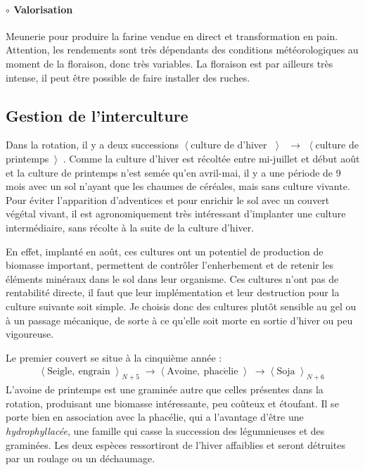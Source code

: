\documentclass{book}
\begin{document}
\paragraph{$\circ$ Valorisation} Meunerie pour produire la farine vendue en direct et transformation en pain. Attention, les rendements sont très dépendants des conditions météorologiques au moment de la floraison, donc très variables. La floraison est par ailleurs très intense, il peut être possible de faire installer des ruches.

\subsection{Gestion de l'interculture}

Dans la rotation, il y a deux successions $\left\langle \right. $culture de d'hiver $\left\rangle \right. $ $\longrightarrow$ $\left\langle \right. $culture de printemps$\left\rangle \right. $. Comme la culture d'hiver est récoltée entre mi-juillet et début août et la culture de printemps n'est semée qu'en avril-mai, il y a une période de 9 mois avec un sol n'ayant que les chaumes de céréales, mais sans culture vivante. Pour éviter l'apparition d'adventices et pour enrichir le sol avec un couvert végétal vivant, il est agronomiquement très intéressant d'implanter une culture intermédiaire, sans récolte à la suite de la culture d'hiver. 

En effet, implanté en août, ces cultures ont un potentiel de production de biomasse important, permettent de contrôler l'enherbement et de retenir les éléments minéraux dans le sol dans leur organisme. Ces cultures n'ont pas de rentabilité directe, il faut que leur implémentation et leur destruction pour la culture suivante soit simple. Je choisis donc des cultures plutôt sensible au gel ou à un passage mécanique, de sorte à ce qu'elle soit morte en sortie d'hiver ou peu vigoureuse. 

Le premier couvert se situe à la cinquième année :
\begin{align*}
\left\langle \right. \mathrm{Seigle,\ engrain}  \left\rangle \right._{N+5}  \longrightarrow \left\langle \right.\mathrm{Avoine,\ phac\acute{e}lie}\left\rangle \right.\longrightarrow \left\langle \right. \mathrm{Soja} \left\rangle \right._{N+6}
\end{align*}
L'avoine de printemps est une graminée autre que celles présentes dans la rotation, produisant une biomasse intéressante, peu coûteux et étoufant. Il se porte bien en association avec la phacélie, qui a l'avantage d'être une \textit{hydrophyllacée}, une famille qui casse la succession des légumnieuses et des graminées. Les deux espèces ressortiront de l'hiver affaiblies et seront détruites par un roulage ou un déchaumage.
\end{document}
